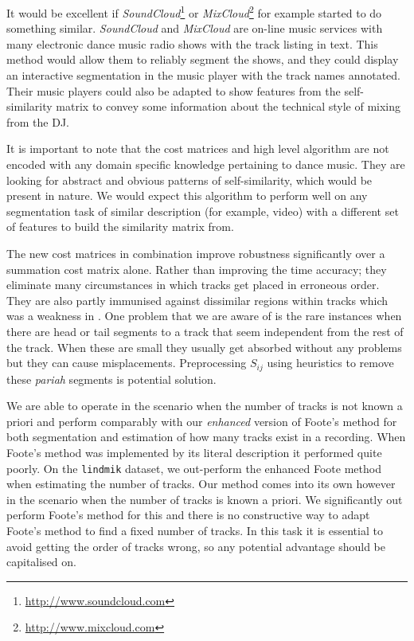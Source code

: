 \documentclass[twocolumn]{article}
\begin{document}
It would be excellent if \textit{SoundCloud}\footnote{\url{http://www.soundcloud.com}} or \textit{MixCloud}\footnote{\url{http://www.mixcloud.com}} for example started to do something similar. \textit{SoundCloud} and \textit{MixCloud} are on-line music services with many electronic dance music radio shows with the track listing in text. This method would allow them to reliably segment the shows, and they could display an interactive segmentation in the music player with the track names annotated. Their music players could also be adapted to show features from the self-similarity matrix to convey some information about the technical style of mixing from the DJ. 

It is important to note that the cost matrices and high level algorithm are not encoded with any domain specific knowledge pertaining to dance music. They are looking for abstract and obvious patterns of self-similarity, which would be present in nature. We would expect this algorithm to perform well on any segmentation task of similar description (for example, video) with a different set of features to build the similarity matrix from. 

The new cost matrices in combination improve robustness significantly over a summation cost matrix alone. Rather than improving the time accuracy; they eliminate many circumstances in which tracks get placed in erroneous order. They are also partly immunised against dissimilar regions within tracks which was a weakness in \citep{scarfe2013long}. One problem that we are aware of is the rare instances when there are head or tail segments to a track that seem independent from the rest of the track. When these are small they usually get absorbed without any problems but they can cause misplacements. Preprocessing $S_{ij}$ using heuristics to remove these \textit{pariah} segments is potential solution.

We are able to operate in the scenario when the number of tracks is not known a priori and perform comparably with our \textit{enhanced} version of Foote's \citep{foote2003media} method for both segmentation and estimation of how many tracks exist in a recording. When Foote's method was implemented by its literal description it performed quite poorly. On the \texttt{lindmik} dataset, we out-perform the enhanced Foote method when estimating the number of tracks. Our method comes into its own however in the scenario when the number of tracks is known a priori. We significantly out perform Foote's method for this and there is no constructive way to adapt Foote's method to find a fixed number of tracks. In this task it is essential to avoid getting the order of tracks wrong, so any potential advantage should be capitalised on. 
\end{document}
